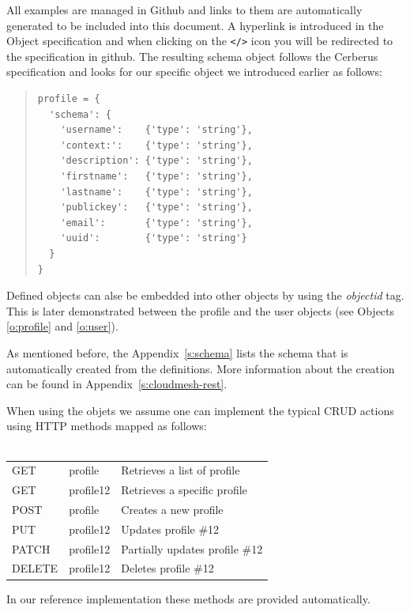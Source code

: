 \documentclass[10pt]{article}
\begin{document}
All examples are managed in Github and links to them are automatically
generated to be included into this document. A hyperlink is introduced
in the Object specification and when clicking on the \verb|</>| icon
you will be redirected to the specification in github. The resulting
schema object follows the Cerberus \cite{www-cerberus} specification
and looks for our specific object we introduced earlier as follows:

\begin{quote}
\begin{Verbatim}
profile = {
  'schema': {
    'username':    {'type': 'string'},
    'context:':    {'type': 'string'},
    'description': {'type': 'string'},
    'firstname':   {'type': 'string'},
    'lastname':    {'type': 'string'},
    'publickey':   {'type': 'string'},
    'email':       {'type': 'string'},
    'uuid':        {'type': 'string'}
  }
}
\end{Verbatim}
\end{quote}

Defined objects can alse be embedded into other objects by using the
{\it objectid} tag. This is later demonstrated between the profile
and the user objects (see Objects \ref{o:profile} and \ref{o:user}).


As mentioned before, the Appendix~\ref{s:schema} lists the schema
that is automatically created from the definitions. More information
about the creation can be found in Appendix~\ref{s:cloudmesh-rest}.

When using the objets we assume one can implement the typical CRUD
actions using HTTP methods mapped as follows: \\ ~\\

\begin{tabular}{lll}
GET & \/profile & Retrieves a list of profile \\
GET & \/profile\/12 & Retrieves a specific profile \\
POST & \/profile & Creates a new profile \\
PUT & \/profile\/12 & Updates profile \#12 \\
PATCH & \/profile\/12 &  Partially updates profile \#12 \\
DELETE & \/profile\/12 &  Deletes profile \#12 \\
\end{tabular}

In our reference implementation these methods are provided
automatically.
\end{document}
